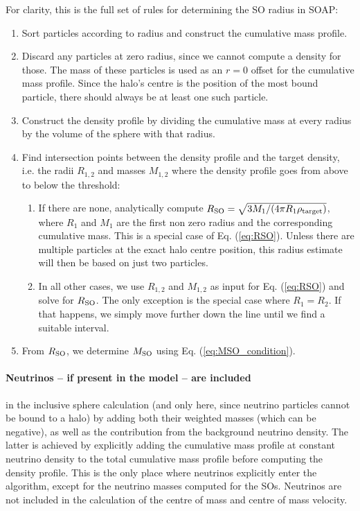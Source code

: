 \documentclass{article}
\begin{document}
For clarity, this is the full set of rules for determining the SO radius in SOAP:
\begin{enumerate}
    \item Sort particles according to radius and construct the cumulative mass profile.
    \item Discard any particles at zero radius, since we cannot compute a density for those. The mass of these 
    particles is used as an $r=0$ offset for the cumulative mass profile. Since the halo's centre is the 
    position of the most bound particle, there should always be at least one such particle.
    \item Construct the density profile by dividing the cumulative mass at every radius by the volume of the 
    sphere with that radius.
    \item Find intersection points between the density profile and the target density, i.e. the radii 
    $R_{1,2}$ and masses $M_{1,2}$ where the density profile goes from above to below the threshold:
    \begin{enumerate}
        \item If there are none, analytically compute $R_{\rm{}SO}=\sqrt{3M_1/(4\pi{}R_1\rho_{\rm{}target})}$, 
        where $R_1$ and $M_1$ are the first non zero radius and the corresponding cumulative mass. This is a 
        special case of Eq. (\ref{eq:RSO}). Unless there are multiple particles at the exact halo centre 
        position, this radius estimate will then be based on just two particles.
        \item In all other cases, we use $R_{1,2}$ and $M_{1,2}$ as input for Eq. (\ref{eq:RSO}) and solve for 
        $R_{\rm{}SO}$. The only exception is the special case where $R_1 = R_2$. If that happens, we simply 
        move further down the line until we find a suitable interval.

    \end{enumerate}
    \item From $R_{\rm{}SO}$, we determine $M_{\rm{}SO}$ using Eq. (\ref{eq:MSO_condition}).
\end{enumerate}

\paragraph{Neutrinos -- if present in the model -- are included} in the inclusive sphere calculation (and only 
here, since neutrino particles cannot be bound to a halo) by adding both their weighted masses (which can be 
negative), as well as the contribution from the background neutrino density. The latter is achieved by 
explicitly adding the cumulative mass profile at constant neutrino density to the total cumulative mass 
profile before computing the density profile. This is the only place where neutrinos explicitly enter the 
algorithm, except for the neutrino masses computed for the SOs. Neutrinos are not included in the calculation 
of the centre of mass and centre of mass velocity.
\end{document}
